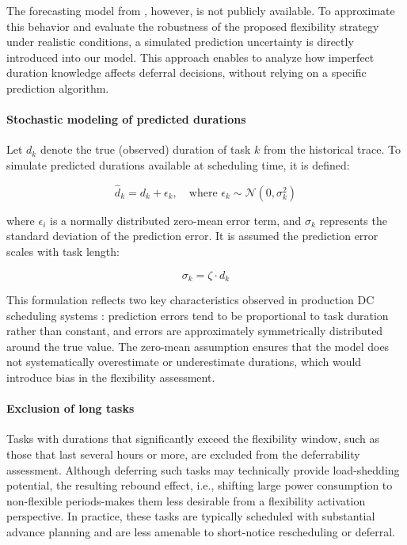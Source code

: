 \documentclass[preprint,12pt]{elsarticle}
\begin{document}
The forecasting model from \cite{Weng2022}, however, is not publicly available. To approximate this behavior and evaluate the robustness of the proposed flexibility strategy under realistic conditions, a simulated prediction uncertainty is directly introduced into our model. This approach enables to analyze how imperfect duration knowledge affects deferral decisions, without relying on a specific prediction algorithm.

\paragraph{Stochastic modeling of predicted durations}

Let $d_k$ denote the true (observed) duration of task $k$ from the historical trace. To simulate predicted durations available at scheduling time, it is defined:

\begin{equation}
    \hat{d}_k = d_k + \epsilon_k, \quad \text{where } \epsilon_k \sim \mathcal{N}(0, \sigma_k^2)
\end{equation}

where $\epsilon_i$ is a normally distributed zero-mean error term, and $\sigma_k$ represents the standard deviation of the prediction error. It is assumed the prediction error scales with task length:

\begin{equation}
    \sigma_k = \zeta \cdot d_k
\end{equation}

This formulation reflects two key characteristics observed in production DC scheduling systems \cite{Hu2021, Yeung2022}: prediction errors tend to be proportional to task duration rather than constant, and errors are approximately symmetrically distributed around the true value. The zero-mean assumption ensures that the model does not systematically overestimate or underestimate durations, which would introduce bias in the flexibility assessment. 

\paragraph{Exclusion of long tasks}
Tasks with durations that significantly exceed the flexibility window, such as those that last several hours or more, are excluded from the deferrability assessment. Although deferring such tasks may technically provide load-shedding potential, the resulting rebound effect, i.e., shifting large power consumption to non-flexible periods-makes them less desirable from a flexibility activation perspective. In practice, these tasks are typically scheduled with substantial advance planning and are less amenable to short-notice rescheduling or deferral.
\end{document}
